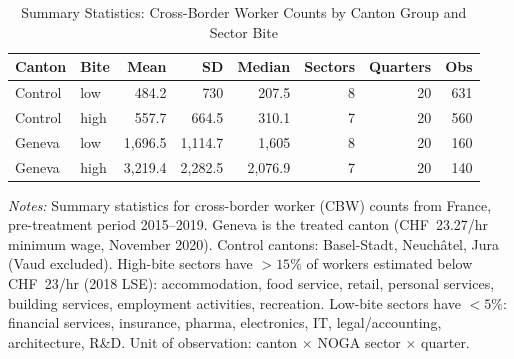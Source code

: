 \begin{table}[htbp]
\centering
\caption{Summary Statistics: Cross-Border Worker Counts by Canton Group and Sector Bite}
\label{tab:summary}
\begin{tabular}{llrrrrrr}
\toprule
Canton & Bite & Mean & SD & Median & Sectors & Quarters & Obs \\
\midrule
Control & low & 484.2 & 730 & 207.5 & 8 & 20 & 631 \\
Control & high & 557.7 & 664.5 & 310.1 & 7 & 20 & 560 \\
Geneva & low & 1,696.5 & 1,114.7 & 1,605 & 8 & 20 & 160 \\
Geneva & high & 3,219.4 & 2,282.5 & 2,076.9 & 7 & 20 & 140 \\
\bottomrule
\end{tabular}
\begin{tablenotes}
\small
\item \textit{Notes:} Summary statistics for cross-border worker (CBW) counts from France, pre-treatment period 2015--2019. Geneva is the treated canton (CHF~23.27/hr minimum wage, November 2020). Control cantons: Basel-Stadt, Neuch\^atel, Jura (Vaud excluded). High-bite sectors have $>15\%$ of workers estimated below CHF~23/hr (2018 LSE): accommodation, food service, retail, personal services, building services, employment activities, recreation. Low-bite sectors have $<5\%$: financial services, insurance, pharma, electronics, IT, legal/accounting, architecture, R\&D. Unit of observation: canton $\times$ NOGA sector $\times$ quarter.
\end{tablenotes}
\end{table}
